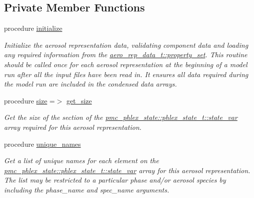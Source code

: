 \subsection*{Private Member Functions}
\begin{DoxyCompactItemize}
\item 
procedure \mbox{\hyperlink{structpmc__aero__rep__single__particle_1_1aero__rep__single__particle__t_a9074d86ca4cf12ebaea525acf0109a14}{initialize}}
\begin{DoxyCompactList}\small\item\em Initialize the aerosol representation data, validating component data and loading any required information from the {\ttfamily \mbox{\hyperlink{structpmc__aero__rep__data_1_1aero__rep__data__t_a87b1bf5cd10a0a2b51390fb24ebf56c5}{aero\+\_\+rep\+\_\+data\+\_\+t\+::property\+\_\+set}}}. This routine should be called once for each aerosol representation at the beginning of a model run after all the input files have been read in. It ensures all data required during the model run are included in the condensed data arrays. \end{DoxyCompactList}\item 
procedure \mbox{\hyperlink{structpmc__aero__rep__single__particle_1_1aero__rep__single__particle__t_ac83035311d1527591944931a5c6b75ff}{size}} =$>$ \mbox{\hyperlink{interfacepmc__aero__rep__data_1_1get__size}{get\+\_\+size}}
\begin{DoxyCompactList}\small\item\em Get the size of the section of the {\ttfamily \mbox{\hyperlink{structpmc__phlex__state_1_1phlex__state__t_a78835cb552d483ebbfc7a6bc6f756918}{pmc\+\_\+phlex\+\_\+state\+::phlex\+\_\+state\+\_\+t\+::state\+\_\+var}}} array required for this aerosol representation. \end{DoxyCompactList}\item 
procedure \mbox{\hyperlink{structpmc__aero__rep__single__particle_1_1aero__rep__single__particle__t_aa8ec2b6a9bef271eba50a3a048a90ac8}{unique\+\_\+names}}
\begin{DoxyCompactList}\small\item\em Get a list of unique names for each element on the {\ttfamily \mbox{\hyperlink{structpmc__phlex__state_1_1phlex__state__t_a78835cb552d483ebbfc7a6bc6f756918}{pmc\+\_\+phlex\+\_\+state\+::phlex\+\_\+state\+\_\+t\+::state\+\_\+var}}} array for this aerosol representation. The list may be restricted to a particular phase and/or aerosol species by including the phase\+\_\+name and spec\+\_\+name arguments. \end{DoxyCompactList}\item 

\end{DoxyCompactItemize}
